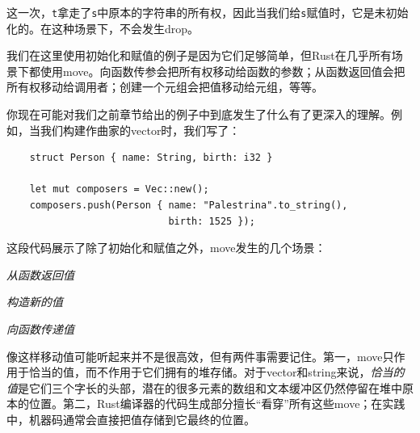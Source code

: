 这一次，\texttt{t}拿走了\texttt{s}中原本的字符串的所有权，因此当我们给\texttt{s}赋值时，它是未初始化的。在这种场景下，不会发生drop。

我们在这里使用初始化和赋值的例子是因为它们足够简单，但Rust在几乎所有场景下都使用move。向函数传参会把所有权移动给函数的参数；从函数返回值会把所有权移动给调用者；创建一个元组会把值移动给元组，等等。

你现在可能对我们之前章节给出的例子中到底发生了什么有了更深入的理解。例如，当我们构建作曲家的vector时，我们写了：
\begin{verbatim}
    struct Person { name: String, birth: i32 }

    let mut composers = Vec::new();
    composers.push(Person { name: "Palestrina".to_string(), 
                            birth: 1525 });
\end{verbatim}

这段代码展示了除了初始化和赋值之外，move发生的几个场景：
\begin{flushleft}
    \emph{从函数返回值}
\end{flushleft}


\begin{flushleft}
    \emph{构造新的值}
\end{flushleft}


\begin{flushleft}
    \emph{向函数传递值}
\end{flushleft}


像这样移动值可能听起来并不是很高效，但有两件事需要记住。第一，move只作用于恰当的值，而不作用于它们拥有的堆存储。对于vector和string来说，\emph{恰当的值}是它们三个字长的头部，潜在的很多元素的数组和文本缓冲区仍然停留在堆中原本的位置。第二，Rust编译器的代码生成部分擅长“看穿”所有这些move；在实践中，机器码通常会直接把值存储到它最终的位置。

